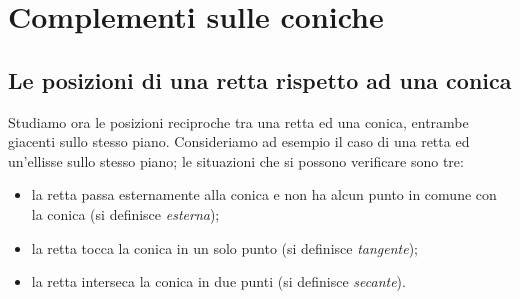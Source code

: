 
% 
% 


\chapter{Complementi sulle coniche}
\label{sec:coniche}

\section{Le posizioni di una retta rispetto ad una conica}
\label{sec:coniche_e_retta}

Studiamo ora le posizioni reciproche tra una retta ed una conica, entrambe 
giacenti sullo stesso piano. Consideriamo ad esempio il caso di una retta 
ed un'ellisse sullo stesso piano; le situazioni che si possono verificare 
sono tre:
\begin{itemize} [noitemsep]
  \item la retta passa esternamente alla conica e non ha alcun 
punto in comune con la conica (si definisce \emph{esterna});
  \item la retta tocca la conica in un solo punto
 (si definisce \emph{tangente});
  \item la retta interseca la conica in due punti  (si definisce \emph{secante}).
  \end{itemize}
  
